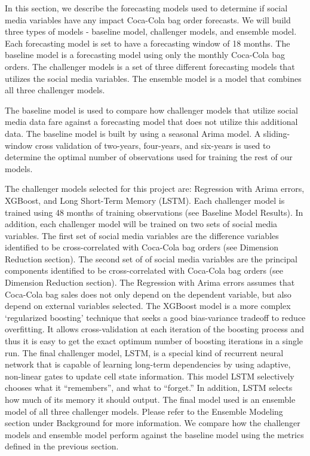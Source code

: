 \documentclass[12pt,oneside]{chicagocapstone}
\begin{document}
In this section, we describe the forecasting models used to determine if social media variables have any impact Coca-Cola bag order forecasts. We will build three types of models - baseline model, challenger models, and ensemble model. Each forecasting model is set to have a forecasting window of 18 months. The baseline model is a forecasting model using only the monthly Coca-Cola bag orders. The challenger models is a set of three different forecasting models that utilizes the social media variables. The ensemble model is a model that combines all three challenger models.

The baseline model is used to compare how challenger models that utilize social media data fare against a forecasting model that does not utilize this additional data. The baseline model is built by using a seasonal Arima model. A sliding-window cross validation of two-years, four-years, and six-years is used to determine the optimal number of observations used for training the rest of our models.

The challenger models selected for this project are: Regression with Arima errors, XGBoost, and Long Short-Term Memory (LSTM). Each challenger model is trained using 48 months of training observations (see Baseline Model Results). In addition, each challenger model will be trained on two sets of social media variables. The first set of social media variables are the difference variables identified to be cross-correlated with Coca-Cola bag orders (see Dimension Reduction section). The second set of of social media variables are the principal components identified to be cross-correlated with Coca-Cola bag orders (see Dimension Reduction section). The Regression with Arima errors assumes that Coca-Cola bag sales does not only depend on the dependent variable, but also depend on external variables selected. The XGBoost model is a more complex `regularized boosting' technique that seeks a good bias-variance tradeoff to reduce overfitting. It allows cross-validation at each iteration of the boosting process and thus it is easy to get the exact optimum number of boosting iterations in a single run. The final challenger model, LSTM, is a special kind of recurrent neural network that is capable of learning long-term dependencies by using adaptive, non-linear gates to update cell state information. This model LSTM selectively chooses what it ``remembers'', and what to ``forget.'' In addition, LSTM selects how much of its memory it should output.
The final model used is an ensemble model of all three challenger models. Please refer to the Ensemble Modeling section under Background for more information. We compare how the challenger models and ensemble model perform against the baseline model using the metrics defined in the previous section.
\end{document}
